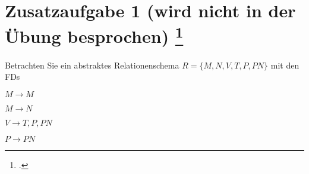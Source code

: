 \documentclass{lehramt-informatik-aufgabe}
\begin{document}

\section{Zusatzaufgabe 1 (wird nicht in der Übung
besprochen)
\footcite{db:pdf:tum:uebung-08}}

Betrachten Sie ein abstraktes Relationenschema $R = \{M, N, V, T, P,
PN\}$ mit den FDs

\begin{compactitem}
\item $M \rightarrow M$
\item $M \rightarrow N$
\item $V \rightarrow T, P, PN$
\item $P \rightarrow PN$
\end{compactitem}
\end{document}
